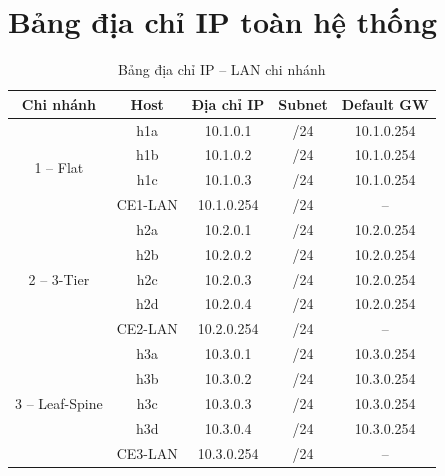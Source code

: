 \section{Bảng địa chỉ IP toàn hệ thống}

\begin{table}[htbp]
    \centering
    \caption{Bảng địa chỉ IP – LAN chi nhánh}
    \vspace{0.2cm}
    \begin{tabularx}{\textwidth}{|c|c|c|c|c|}
        \hline
        \textbf{Chi nhánh} & \textbf{Host} & \textbf{Địa chỉ IP} & \textbf{Subnet} & \textbf{Default GW} \\ \hline
        \multirow{4}{*}{1 – Flat} & h1a & 10.1.0.1 & /24 & 10.1.0.254 \\ \cline{2-5}
                                   & h1b & 10.1.0.2 & /24 & 10.1.0.254 \\ \cline{2-5}
                                   & h1c & 10.1.0.3 & /24 & 10.1.0.254 \\ \cline{2-5}
                                   & CE1-LAN & 10.1.0.254 & /24 & -- \\ \hline
        \multirow{5}{*}{2 – 3-Tier} & h2a & 10.2.0.1 & /24 & 10.2.0.254 \\ \cline{2-5}
                                     & h2b & 10.2.0.2 & /24 & 10.2.0.254 \\ \cline{2-5}
                                     & h2c & 10.2.0.3 & /24 & 10.2.0.254 \\ \cline{2-5}
                                     & h2d & 10.2.0.4 & /24 & 10.2.0.254 \\ \cline{2-5}
                                     & CE2-LAN & 10.2.0.254 & /24 & -- \\ \hline
        \multirow{5}{*}{3 – Leaf-Spine} & h3a & 10.3.0.1 & /24 & 10.3.0.254 \\ \cline{2-5}
                                         & h3b & 10.3.0.2 & /24 & 10.3.0.254 \\ \cline{2-5}
                                         & h3c & 10.3.0.3 & /24 & 10.3.0.254 \\ \cline{2-5}
                                         & h3d & 10.3.0.4 & /24 & 10.3.0.254 \\ \cline{2-5}
                                         & CE3-LAN & 10.3.0.254 & /24 & -- \\ \hline
    \end{tabularx}
\end{table}

